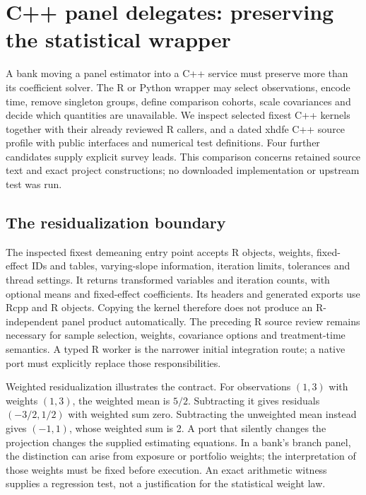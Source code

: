 
\section{C++ panel delegates: preserving the statistical wrapper}
\label{sec:exec25-panels-cxx}
A bank moving a panel estimator into a C++ service must preserve more than
its coefficient solver. The R or Python wrapper may select observations,
encode time, remove singleton groups, define comparison cohorts, scale
covariances and decide which quantities are unavailable. We inspect selected
fixest C++ kernels together with their already reviewed R callers, and a
dated xhdfe C++ source profile with public interfaces and numerical test
definitions. Four further candidates supply explicit survey leads. This
comparison concerns retained source text and exact project constructions;
no downloaded implementation or upstream test was run.
\citep{exec25_panelcxx_fixest,exec20_fixest_source,exec25_panelcxx_xhdfe,exec25_panelcxx_reference}

\subsection{The residualization boundary}
The inspected fixest demeaning entry point accepts R objects, weights,
fixed-effect IDs and tables, varying-slope information, iteration limits,
tolerances and thread settings. It returns transformed variables and iteration
counts, with optional means and fixed-effect coefficients. Its headers and
generated exports use Rcpp and R objects. Copying the kernel therefore does
not produce an R-independent panel product automatically. The preceding
R source review remains necessary for sample selection, weights, covariance
options and treatment-time semantics. A typed R worker is the narrower
initial integration route; a native port must explicitly replace those
responsibilities.\citep{exec25_panelcxx_fixest,exec20_fixest_source}

Weighted residualization illustrates the contract. For observations $(1,3)$
with weights $(1,3)$, the weighted mean is $5/2$. Subtracting it gives
residuals $(-3/2,1/2)$ with weighted sum zero. Subtracting the unweighted
mean instead gives $(-1,1)$, whose weighted sum is 2. A port that silently
changes the projection changes the supplied estimating equations. In a
bank's branch panel, the distinction can arise from exposure or portfolio
weights; the interpretation of those weights must be fixed before execution.
An exact arithmetic witness supplies a regression test, not a justification
for the statistical weight law.\citep{exec25_panelcxx_reference}

